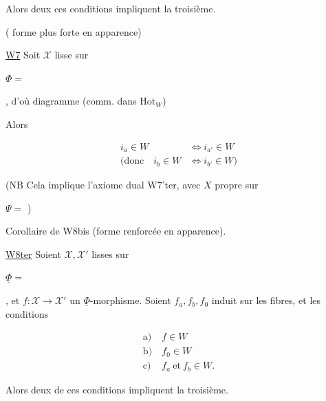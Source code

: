 Alors deux  ces conditions impliquent la troisième.


 ( forme plus forte en apparence)

\uline{W7} Soit $\mathcal X$ lisse sur

$\Phi={}$

, d'où diagramme (comm. dans Hot$_W$)


Alors

\[
\begin{aligned}
i_a\in W&\Longleftrightarrow i_{a'}\in W\\
(\text{donc}\quad i_b\in W&\Longleftrightarrow i_{b'}\in W)
\end{aligned}
\]

(NB Cela implique l'axiome dual W7'ter, avec $X$ propre sur

$\Psi={}$ )

Corollaire de W8bis (forme renforcée en apparence).

\uline{W8ter} Soient $\mathcal X,\mathcal X'$ lisses sur

$\underline\Phi={}$

, et $f\colon\mathcal X\longrightarrow\mathcal X'$ un $\underline\Phi$-morphisme. Soient $f_a,f_b,f_0$ induit sur les fibres, et les conditions

\[
\begin{aligned}
\text{a)}\ & f\in W\\
\text{b)}\ & f_0\in W\\
\text{c)}\ & f_a\ \text{et}\ f_b\in W.
\end{aligned}
\]

Alors deux de ces conditions impliquent la troisième.
